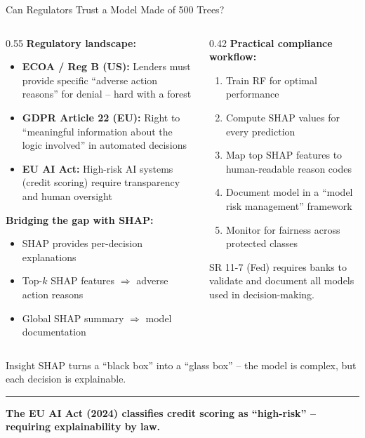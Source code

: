 \documentclass[8pt,aspectratio=169]{beamer}
\newcommand{\bottomnote}[1]{%
\vfill
\vspace{-2mm}
\textcolor{mllavender2}{\rule{\textwidth}{0.4pt}}
\vspace{1mm}
\footnotesize
\textbf{#1}
}
\newenvironment{compactlist}{%
  \begin{itemize}%
    \setlength{\itemsep}{2pt}%
    \setlength{\parskip}{0pt}%
    \setlength{\parsep}{0pt}%
}{%
  \end{itemize}%
}
\begin{document}
\begin{frame}{Can Regulators Trust a Model Made of 500 Trees?}
\begin{columns}[T]
\begin{column}{0.55\textwidth}
\small
\textbf{Regulatory landscape:}
\begin{compactlist}
\item \textbf{ECOA / Reg B (US):} Lenders must provide specific ``adverse action reasons'' for denial -- hard with a forest
\item \textbf{GDPR Article 22 (EU):} Right to ``meaningful information about the logic involved'' in automated decisions
\item \textbf{EU AI Act:} High-risk AI systems (credit scoring) require transparency and human oversight
\end{compactlist}

\vspace{0.3em}
\footnotesize
\textbf{Bridging the gap with SHAP:}
\begin{compactlist}
\item SHAP provides per-decision explanations
\item Top-$k$ SHAP features $\Rightarrow$ adverse action reasons
\item Global SHAP summary $\Rightarrow$ model documentation
\end{compactlist}
\end{column}
\begin{column}{0.42\textwidth}
\footnotesize
\textbf{Practical compliance workflow:}
\begin{enumerate}
\setlength{\itemsep}{2pt}
\item Train RF for optimal performance
\item Compute SHAP values for every prediction
\item Map top SHAP features to human-readable reason codes
\item Document model in a ``model risk management'' framework
\item Monitor for fairness across protected classes
\end{enumerate}

\vspace{0.5em}
\scriptsize SR 11-7 (Fed) requires banks to validate and document all models used in decision-making.
\end{column}
\end{columns}

\begin{block}{Insight}
\scriptsize SHAP turns a ``black box'' into a ``glass box'' -- the model is complex, but each decision is explainable.
\end{block}
\bottomnote{The EU AI Act (2024) classifies credit scoring as ``high-risk'' -- requiring explainability by law.}
\end{frame}
\end{document}
